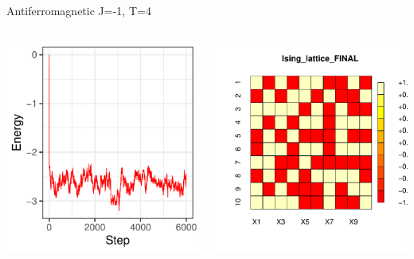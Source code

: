 \documentclass{beamer}
\begin{document}
\begin{frame}{Antiferromagnetic J=-1, T=4}
\begin{columns}
\begin{column}{0.5\textwidth}
    \begin{center}
     \includegraphics[width=\textwidth]{Pic/J-1_60_2500_T=4_ENERGY.pdf}
     \end{center}
\end{column}
\begin{column}{0.5\textwidth}
    \begin{center}
     \includegraphics[width=\textwidth]{Pic/J-1_60_2500_T=4_FINAL.pdf}

\end{center}
\end{column}
\end{columns}
\end{frame}
\end{document}
